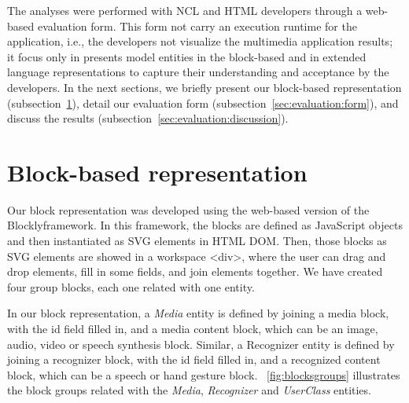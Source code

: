 \documentclass[
  doutorado,
  american
]{ThesisPUC}
\newcommand{\fig}[1]{\figurename~\ref{#1}}
\newcommand{\subsect}[1]{subsection~\ref{#1}}
\begin{document}

The analyses were performed with NCL and HTML developers through a web-based
evaluation form. This form not carry an execution runtime for the application,
i.e., the developers not visualize the multimedia application results; it focus 
only in presents model entities in the block-based and in extended language 
representations to capture their understanding and acceptance by the 
developers. In the next sections, we briefly present our block-based
representation (\subsect{sec:evaluation:blocks}), detail our evaluation form 
(\subsect{sec:evaluation:form}), and discuss the results 
(\subsect{sec:evaluation:discussion}). 

\section{Block-based representation}
\label{sec:evaluation:blocks}

Our block representation was developed using the web-based version of the
Blockly\footnotemark framework. In this framework, the blocks are defined as 
JavaScript
objects and then instantiated as SVG elements in HTML DOM. Then, those blocks as
SVG elements are showed in a workspace <div>, where the user can drag and drop
elements, fill in some fields, and join elements together. We have created four
group blocks, each one related with one entity.


In our block representation, a \textit{Media} entity is defined by joining a
media block, with the id field filled in, and a media content block, which can
be an image, audio, video or speech synthesis block. Similar, a Recognizer
entity is defined by joining a recognizer block, with the id field filled in,
and a recognized content block, which can be a speech or hand gesture block.
\fig{fig:blocksgroups} illustrates the block groups related with the 
\textit{Media}, 
\textit{Recognizer} and 
\textit{UserClass} entities.
\end{document}
